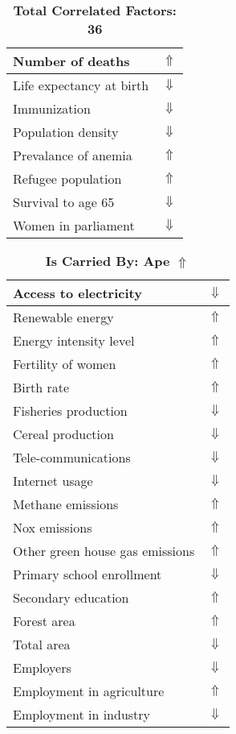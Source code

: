 \documentclass[12pt,notitlepage,oneside]{report}
\begin{document}
\begin{table}[!htb]
\begin{tabular}{|l|l|}
Number of deaths & $\Uparrow$\\ \hline
Life expectancy at birth & $\Downarrow$\\ \hline
Immunization & $\Downarrow$\\ \hline
Population density & $\Downarrow$\\ \hline
Prevalance of anemia & $\Uparrow$\\ \hline
Refugee population & $\Uparrow$\\ \hline
Survival to age 65 & $\Downarrow$\\ \hline
Women in parliament & $\Downarrow$\\ \hline
\end{tabular}
\caption*{\textbf{Total Correlated Factors: 36}}
\end{table}
\clearpage
\begin{table}[!htb]
\caption{\textbf{Is Carried By: Ape $\Uparrow$}}
\centering
\label{Correlated Socio-economic Factors0}
\begin{tabular}{|l|l|}
\hline
Access to electricity & $\Downarrow$\\ \hline
Renewable energy & $\Uparrow$\\ \hline
Energy intensity level & $\Uparrow$\\ \hline
Fertility of women & $\Uparrow$\\ \hline
Birth rate & $\Uparrow$\\ \hline
Fisheries production & $\Downarrow$\\ \hline
Cereal production & $\Downarrow$\\ \hline
Tele-communications & $\Downarrow$\\ \hline
Internet usage & $\Downarrow$\\ \hline
Methane emissions & $\Uparrow$\\ \hline
Nox emissions & $\Uparrow$\\ \hline
Other green house gas emissions & $\Uparrow$\\ \hline
Primary school enrollment & $\Downarrow$\\ \hline
Secondary education & $\Uparrow$\\ \hline
Forest area & $\Uparrow$\\ \hline
Total area & $\Downarrow$\\ \hline
Employers & $\Downarrow$\\ \hline
Employment in agriculture & $\Uparrow$\\ \hline
Employment in industry & $\Downarrow$\\ \hline

\end{tabular}
\end{table}
\end{document}
